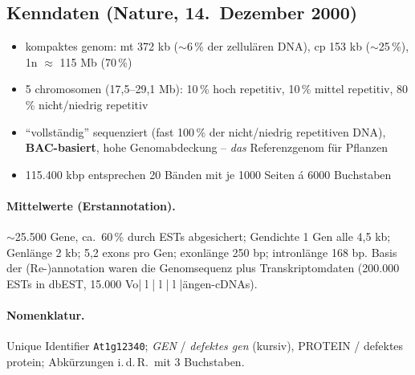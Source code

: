 \subsection*{Kenndaten (Nature, 14.\ Dezember 2000)}\label{subsec:kenndaten-(nature-14.-dezember-2000)}
\begin{itemize}
    \item kompaktes \gls{genom}: mt 372 kb ($\sim$6\,\% der zellulären DNA), cp 153 kb ($\sim$25\,\%), 1n $\approx$ 115 Mb (70\,\%)
    \item 5 \gls{chromosom}en (17,5--29,1 Mb): 10\,\% hoch repetitiv, 10\,\% mittel repetitiv, 80\,\% nicht/niedrig repetitiv
    \item ``vollständig'' sequenziert (fast 100\,\% der nicht/niedrig repetitiven DNA), \textbf{BAC-basiert}, hohe Genomabdeckung -- \emph{das} Referenzgenom für Pflanzen
    \item 115.400 kbp entsprechen 20 Bänden mit je 1000 Seiten á 6000 Buchstaben
\end{itemize}

\paragraph{Mittelwerte (Erstannotation).} $\sim$25.500 Gene, ca.\ 60\,\% durch ESTs abgesichert; Gendichte 1 Gen alle 4,5 kb; Genlänge 2 kb; 5,2 \gls{exon}s pro Gen; \gls{exon}länge 250 bp; \gls{intron}länge 168 bp.
Basis der (Re-)\gls{annotation} waren die Genomsequenz plus Transkriptomdaten (200.000 ESTs in dbEST, 15.000 Vo| l | l | l |ängen-cDNAs).

\paragraph{Nomenklatur.} Unique Identifier \texttt{At1g12340}; \emph{GEN} / \emph{defektes gen} (kursiv), PROTEIN / defektes protein; Abkürzungen i.\,d.\,R.\ mit 3 Buchstaben.



